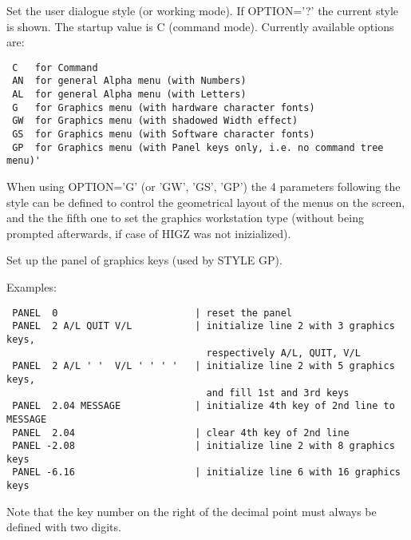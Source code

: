 \BEGARG
{}
\ENDARG
\BEGTEXT
Set the user dialogue style (or working mode).
If OPTION='?' the current style is shown.
The startup value is C (command mode).
Currently available options are:
\begin{verbatim}
 C   for Command
 AN  for general Alpha menu (with Numbers)
 AL  for general Alpha menu (with Letters)
 G   for Graphics menu (with hardware character fonts)
 GW  for Graphics menu (with shadowed Width effect)
 GS  for Graphics menu (with Software character fonts)
 GP  for Graphics menu (with Panel keys only, i.e. no command tree menu)'
\end{verbatim}

When using OPTION='G' (or 'GW', 'GS', 'GP') the 4 parameters following
the style can be defined to control the geometrical layout
of the menus on the screen, and the the fifth one to set the graphics
workstation type (without being prompted afterwards, if case of HIGZ
was not inizialized).
\ENDTEXT

\BEGARG
{}
\ENDARG
\BEGTEXT
Set up the panel of graphics keys (used by STYLE GP).

Examples:
\begin{verbatim}
 PANEL  0                        | reset the panel
 PANEL  2 A/L QUIT V/L           | initialize line 2 with 3 graphics keys,
                                   respectively A/L, QUIT, V/L
 PANEL  2 A/L ' '  V/L ' ' ' '   | initialize line 2 with 5 graphics keys,
                                   and fill 1st and 3rd keys
 PANEL  2.04 MESSAGE             | initialize 4th key of 2nd line to MESSAGE
 PANEL  2.04                     | clear 4th key of 2nd line
 PANEL -2.08                     | initialize line 2 with 8 graphics keys
 PANEL -6.16                     | initialize line 6 with 16 graphics keys
\end{verbatim}
Note that the key number on the right of the decimal point must
always be defined with two digits.

